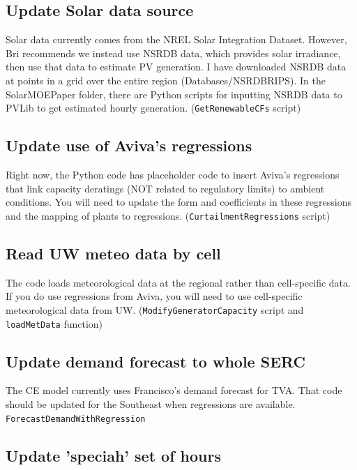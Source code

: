 \documentclass[11pt, oneside]{article}   	%
\begin{document}
\subsection{Update Solar data source}
Solar data currently comes from the NREL Solar Integration Dataset. However, Bri recommends we instead use NSRDB data, which provides solar irradiance, then use that data to estimate PV generation. I have downloaded NSRDB data at points in a grid over the entire region (Databases/NSRDBRIPS). In the SolarMOEPaper folder, there are Python scripts for inputting NSRDB data to PVLib to get estimated hourly generation. (\texttt{GetRenewableCFs} script)

\subsection{Update use of Aviva's regressions}

Right now, the Python code has placeholder code to insert Aviva's regressions that link capacity deratings (NOT related to regulatory limits) to ambient conditions. You will need to update the form and coefficients in these regressions and the mapping of plants to regressions.  (\texttt{CurtailmentRegressions} script)

\subsection{Read UW meteo data by cell}

The code loads meteorological data at the regional rather than cell-specific data. If you do use regressions from Aviva, you will need to use cell-specific meteorological data from UW.  (\texttt{ModifyGeneratorCapacity} script and \texttt{loadMetData} function)


\subsection{Update demand forecast to whole SERC}

The CE model currently uses Francisco's demand forecast for TVA. That code should be updated for the Southeast when regressions are available. \\ \texttt{ForecastDemandWithRegression}

\subsection{Update 'speciah' set of hours}
\end{document}
